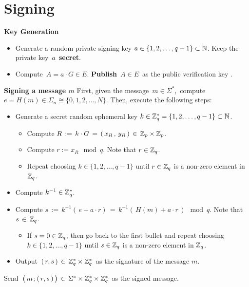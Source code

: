 
\section{Signing}
\setcounter{theorem}{0}
\setcounter{equation}{0}


\vskip 0.2cm
\noindent
\textbf{Key Generation}
\begin{itemize}
\item
	Generate a random private signing key $a \in \{1,2,\ldots,q-1\} \subset \mathbb{N}$.
	Keep the private key \,$a$\, \textbf{\color{red}secret}.
\item
	Compute \,$A = a \cdot G \in E$.
	\textbf{\color{red}Publish} \,$A \in E$\, as the public verification key .
\end{itemize}

\vskip 0.3cm
\noindent
\textbf{Signing a message $m$}
\vskip 0.3cm
\noindent
First, given the message \,$m \in \Sigma^{*}$,\,
compute \,$e = H(m) \in \Sigma_{n} \cong \{0,1,2,\ldots,N\}$.
\vskip 0.3cm
\noindent
Then, execute the following steps:
\begin{itemize}
\item
	Generate a secret random ephemeral key $k \in \mathbb{Z}_{q}^{*} = \{1,2,\ldots,q-1\} \subset \mathbb{N}$.
	\begin{itemize}
	\item
		Compute $R \, := \, k \cdot G \,=\, \left(\,x_{R}\,,\,y_{R}\,\right) \,\in\, \mathbb{Z}_{p} \times \mathbb{Z}_{p}$.
	\item
		Compute $r := x_{R} \!\mod q$.\; Note that $r \in \mathbb{Z}_{q}$.
	\item
		Repeat choosing $k \in \{1,2,\ldots,q-1\}$ until $r \in \mathbb{Z}_{q}$ is a non-zero element in $\mathbb{Z}_{q}$.
	\end{itemize}
\item
	Compute $k^{-1} \in \mathbb{Z}_{q}^{*}$.
\item
	Compute $s \, := \, k^{-1}\left(\,e + a \cdot r\right) \, = \, k^{-1}\left(\,H(m) + a \cdot r\,\right)\!\!\mod q$.\;
	Note that $s \,\in\, \mathbb{Z}_{q}$.
	\begin{itemize}
	\item
		If $s = 0 \in \mathbb{Z}_{q}$, then go back to the first bullet and
		repeat choosing $k \in \{1,2,\ldots,q-1\}$
		until $s \in \mathbb{Z}_{q}$ is a non-zero element in $\mathbb{Z}_{q}$.
	\end{itemize}
\item
	Output \,$(\,r,s\,) \,\in\, \mathbb{Z}_{q}^{*} \times \mathbb{Z}_{q}^{*}$\,
	as the signature of the message $m$.
\end{itemize}
\vskip 0.3cm
\noindent
Send
\,$\left(\,m \,\overset{{\color{white}.}}{;}\,(\,r,s\,)\,\right) \,\in\, \Sigma^{*} \times \Z_{q}^{*} \times \Z_{q}^{*}$\,
as the signed message.

